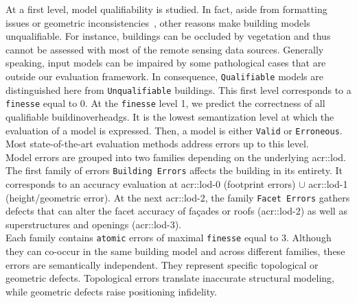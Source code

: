         At a first level, model qualifiability is studied.
        In fact, aside from formatting issues or geometric inconsistencies~\parencite{ledoux2018val3dity}, other reasons make building models unqualifiable.
        For instance, buildings can be occluded by vegetation and thus cannot be assessed with most of the remote sensing data sources.
        Generally speaking, input models can be impaired by some pathological cases that are outside our evaluation framework.
        In consequence, \texttt{Qualifiable} models are distinguished here from \texttt{Unqualifiable} buildings.
        This first level corresponds to a \texttt{finesse} equal to 0. At the \texttt{finesse} level 1, we predict the correctness of all qualifiable buildinoverheadgs.
        It is the lowest semantization level at which the evaluation of a model is expressed.
        Then, a model is either \texttt{Valid} or \texttt{Erroneous}.
        Most state-of-the-art evaluation methods address errors up to this level.\\
        Model errors are grouped into two families depending on the underlying \gls{acr::lod}.
        The first family of errors \texttt{Building Errors} affects the building in its entirety.
        It corresponds to an accuracy evaluation at \gls{acr::lod}-0 (footprint errors) $\cup$ \gls{acr::lod}-1 (height/geometric error).
        At the next \gls{acr::lod}-2, the family \texttt{Facet Errors} gathers defects that can alter the facet accuracy of fa\c{c}ades or roofs (\gls{acr::lod}-2) as well as superstructures and openings (\gls{acr::lod}-3).\\
        Each family contains \texttt{atomic} errors of maximal \texttt{finesse} equal to 3.
        Although they can co-occur in the same building model and across different families, these errors are semantically independent.
        They represent specific topological or geometric defects.
        Topological errors translate inaccurate structural modeling, while geometric defects raise positioning infidelity.\\

